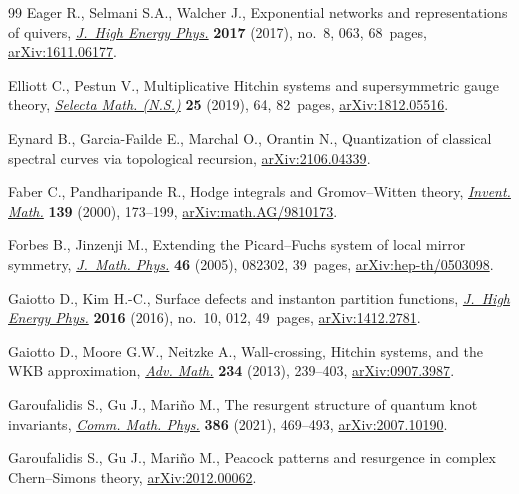 \documentclass[pdftex]{sigma}
\numberwithin{equation}{section}
\begin{document}
\begin{thebibliography}{99}
Eager R., Selmani S.A., Walcher J., Exponential networks and representations of
 quivers, \href{https://doi.org/10.1007/jhep08(2017)063}{\textit{J.~High Energy Phys.}} \textbf{2017} (2017), no.~8, 063,
 68~pages, \href{https://arxiv.org/abs/1611.06177}{arXiv:1611.06177}.

Elliott C., Pestun V., Multiplicative {H}itchin systems and supersymmetric
 gauge theory, \href{https://doi.org/10.1007/s00029-019-0510-y}{\textit{Selecta Math. (N.S.)}} \textbf{25} (2019), 64, 82~pages,
 \href{https://arxiv.org/abs/1812.05516}{arXiv:1812.05516}.

Eynard B., Garcia-Failde E., Marchal O., Orantin N., Quantization of classical
 spectral curves via topological recursion, \href{https://arxiv.org/abs/2106.04339}{arXiv:2106.04339}.

Faber C., Pandharipande R., Hodge integrals and {G}romov--{W}itten theory,
 \href{https://doi.org/10.1007/s002229900028}{\textit{Invent. Math.}} \textbf{139} (2000), 173--199,
 \href{https://arxiv.org/abs/math.AG/9810173}{arXiv:math.AG/9810173}.

Forbes B., Jinzenji M., Extending the {P}icard--{F}uchs system of local mirror
 symmetry, \href{https://doi.org/10.1063/1.1996441}{\textit{J.~Math. Phys.}} \textbf{46} (2005), 082302, 39~pages,
 \href{https://arxiv.org/abs/hep-th/0503098}{arXiv:hep-th/0503098}.

Gaiotto D., Kim H.-C., Surface defects and instanton partition functions,
 \href{https://doi.org/10.1007/JHEP10(2016)012}{\textit{J.~High Energy Phys.}} \textbf{2016} (2016), no.~10, 012, 49~pages,
 \href{https://arxiv.org/abs/1412.2781}{arXiv:1412.2781}.

Gaiotto D., Moore G.W., Neitzke A., Wall-crossing, {H}itchin systems, and the
 {WKB} approximation, \href{https://doi.org/10.1016/j.aim.2012.09.027}{\textit{Adv. Math.}} \textbf{234} (2013), 239--403,
 \href{https://arxiv.org/abs/0907.3987}{arXiv:0907.3987}.

Garoufalidis S., Gu J., Mari\~no M., The resurgent structure of quantum knot
 invariants, \href{https://doi.org/10.1007/s00220-021-04076-0}{\textit{Comm. Math. Phys.}} \textbf{386} (2021), 469--493,
 \href{https://arxiv.org/abs/2007.10190}{arXiv:2007.10190}.

Garoufalidis S., Gu J., Mari\~no M., Peacock patterns and resurgence in complex
 {C}hern--{S}imons theory, \href{https://arxiv.org/abs/2012.00062}{arXiv:2012.00062}.


\end{thebibliography}
\end{document}

